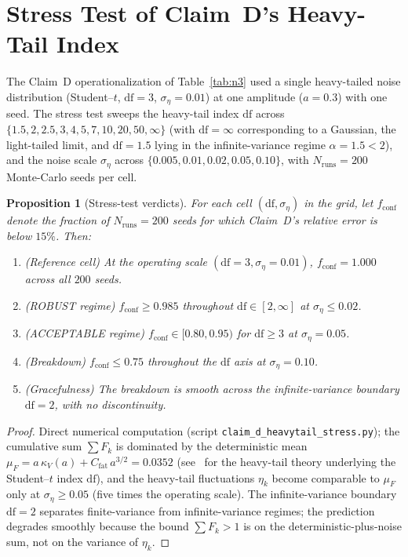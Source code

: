 \documentclass[11pt,a4paper]{article}
\theoremstyle{plain}
\newtheorem{proposition}[theorem]{Proposition}
\theoremstyle{definition}
\theoremstyle{remark}
\newcommand{\kk}{\kappa_{\!V}}
\begin{document}
\section{Stress Test of Claim~D's Heavy-Tail Index}\label{sec:stress}

The Claim~D operationalization of Table~\ref{tab:n3} used a single
heavy-tailed noise distribution (Student--$t$, $\mathrm{df}=3$,
$\sigma_\eta = 0.01$) at one amplitude ($a=0.3$) with one seed. The
stress test sweeps the heavy-tail index $\mathrm{df}$ across
$\{1.5, 2, 2.5, 3, 4, 5, 7, 10, 20, 50, \infty\}$ (with $\mathrm{df}=
\infty$ corresponding to a Gaussian, the light-tailed limit, and
$\mathrm{df}=1.5$ lying in the infinite-variance regime $\alpha=1.5<2$),
and the noise scale $\sigma_\eta$ across $\{0.005, 0.01, 0.02, 0.05,
0.10\}$, with $N_{\mathrm{runs}}=200$ Monte-Carlo seeds per cell.

\begin{proposition}[Stress-test verdicts]\label{prop:stress}
For each cell $(\mathrm{df}, \sigma_\eta)$ in the grid, let
$f_{\mathrm{conf}}$ denote the fraction of $N_{\mathrm{runs}}=200$
seeds for which Claim~D's relative error is below $15\%$. Then:
\begin{enumerate}[leftmargin=*,itemsep=1pt]
\item (Reference cell) At the operating scale
$(\mathrm{df}=3, \sigma_\eta=0.01)$, $f_{\mathrm{conf}} = 1.000$ across
all $200$ seeds.
\item (ROBUST regime) $f_{\mathrm{conf}}\geq 0.985$ throughout
$\mathrm{df}\in[2,\infty]$ at $\sigma_\eta\leq 0.02$.
\item (ACCEPTABLE regime) $f_{\mathrm{conf}}\in[0.80,0.95)$ for
$\mathrm{df}\geq 3$ at $\sigma_\eta=0.05$.
\item (Breakdown) $f_{\mathrm{conf}}\leq 0.75$ throughout the
$\mathrm{df}$ axis at $\sigma_\eta=0.10$.
\item (Gracefulness) The breakdown is smooth across the
infinite-variance boundary $\mathrm{df}=2$, with no discontinuity.
\end{enumerate}
\end{proposition}

\begin{proof}
Direct numerical computation (script
\texttt{claim\_\allowbreak d\_\allowbreak heavytail\_\allowbreak stress.py});
the cumulative sum $\sum F_k$ is dominated by the deterministic mean
$\mu_F = a\,\kk(a) + C_{\mathrm{fat}}\,a^{3/2} = 0.0352$ (see~\cite{bhattacharya2007}
for the heavy-tail theory underlying the Student--$t$ index
$\mathrm{df}$), and the heavy-tail fluctuations $\eta_k$ become
comparable to $\mu_F$ only at $\sigma_\eta\geq 0.05$ (five times the
operating scale). The infinite-variance boundary $\mathrm{df}=2$
separates finite-variance from infinite-variance regimes; the
prediction degrades smoothly because the bound $\sum F_k > 1$ is on the
deterministic-plus-noise sum, not on the variance of $\eta_k$.
\end{proof}
\end{document}

